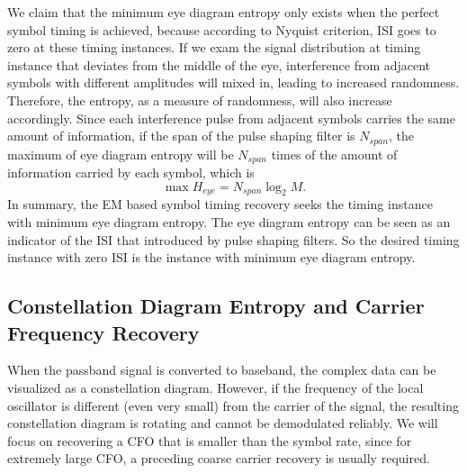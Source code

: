 \documentclass[journal,comsoc, onecolumn, 12pt,draftclsnofoot]{IEEEtran} %
\begin{document}
We claim that the minimum eye diagram entropy only exists when the perfect symbol timing is achieved, because according to Nyquist criterion, ISI goes to zero at these timing instances.
If we exam the signal distribution at timing instance that deviates from the middle of the eye, interference from adjacent symbols with different amplitudes will mixed in, leading to increased randomness.
% 
% 
Therefore, the entropy, as a measure of randomness,  will also increase accordingly.
Since each interference pulse from adjacent symbols carries the same amount of information, 
if the span of the pulse shaping filter is \(N_{span}\), 
the maximum of eye diagram entropy will be \(N_{span}\) times of the amount of information carried by each symbol, which is 
\begin{equation}
\max{H_{eye}} =  N_{span}\log_2 {M}.
\label{eq:entropy_neb}
\end{equation}
In summary, the EM based symbol timing recovery seeks the timing instance with minimum eye diagram entropy. 
The eye diagram entropy can be seen as an indicator of the ISI that introduced by pulse shaping filters.
So the  desired timing instance with zero ISI is the instance with minimum eye diagram entropy. 


\subsection{Constellation Diagram Entropy and Carrier Frequency Recovery}
\label{sec:const_entp}
When the passband signal is converted to baseband, the complex data can be visualized as a constellation diagram.
However, if the frequency of the local oscillator is  different (even very small) from the carrier of the signal, the resulting constellation diagram is rotating and cannot be demodulated reliably.
We will focus on recovering a CFO that is smaller than the symbol rate, since for extremely large CFO, a preceding coarse carrier recovery is usually required.
\end{document}
